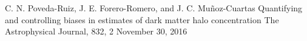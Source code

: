 


\begin{cvpublications}


\cvpublication
{C. N. Poveda-Ruiz, J. E. Forero-Romero, and J. C. Muñoz-Cuartas} %
{Quantifying and controlling biases in estimates of dark matter halo concentration} %
{The Astrophysical Journal, 832, 2} %
{November 30, 2016} %
{} %
\vspace{-0.5cm}
\end{cvpublications}
